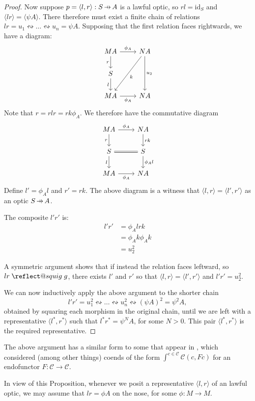 \documentclass[11pt,a4paper]{article}
\makeatletter
\theoremstyle{plain}
\theoremstyle{definition}
\newcommand{\C}{\mathscr{C}}
\newcommand{\id}{\mathrm{id}}
\newcommand{\hto}{\ensuremath{\,\mathaccent\shortmid\rightarrow\,}}
\providecommand{\leftsquigarrow}{%
  \mathrel{\mathpalette\reflect@squig\relax}%
}
\newcommand{\reflect@squig}[2]{%
  \reflectbox{$\m@th#1\rightsquigarrow$}%
}
\makeatother
\begin{document}
\begin{proof}
Now suppose $p = \langle l, r \rangle : S \hto A$ is a lawful optic, so $rl = \id_S$ and $\langle lr \rangle = \langle \psi A\rangle$. There therefore must exist a finite chain of relations $lr = u_1 \leftrightsquigarrow \dots \leftrightsquigarrow u_n = \psi A$.
Supposing that the first relation faces rightwards, we have a diagram:
\[
\begin{tikzcd}
M A \ar[r, "\phi_A"] \ar[d, "r", swap] & N A \ar[dd, "u_2"] \ar[ddl, "k"] \\
S \ar[d,"l",swap] & \\
M A \ar[r, "\phi_A", swap] & N A
\end{tikzcd}
\]
Note that $r = rlr = rk\phi_A$. We therefore have the commutative diagram
\[
\begin{tikzcd}
M A \ar[r, "\phi_A"] \ar[d, "r", swap] & N A \ar[d, "rk"] \\
S \ar[r, equal] \ar[d, "l", swap] & S \ar[d, "\phi_Al"] \\
MA \ar[r, "\phi_A", swap] & N A
\end{tikzcd}
\]
Define $l' = \phi_A l$ and $r' = rk$. The above diagram is a witness that $\langle l, r \rangle = \langle l', r' \rangle$ as an optic $S \hto A$.

The composite $l'r'$ is:
\begin{align*}
l'r' &= \phi_A l r k \\
&= \phi_A k \phi_A k \\
&= u_2^2
\end{align*}

A symmetric argument shows that if instead the relation faces leftward, so $lr \leftsquigarrow g$, there exists $l'$ and $r'$ so that $\langle l, r \rangle = \langle l', r' \rangle$ and $l'r' = u_2^2$.

We can now inductively apply the above argument to the shorter chain \[l'r' = u_1^2 \leftrightsquigarrow \dots \leftrightsquigarrow u_n^2 \leftrightsquigarrow (\psi A)^2 = \psi^2 A,\] obtained by squaring each morphism in the original chain, until we are left with a representative $\langle l^*, r^* \rangle$ such that $l^*r^* = \psi^N A$, for some $N>0$. This pair $\langle l^*, r^* \rangle$ is the required representative.
\end{proof}

The above argument has a similar form to some that appear in \cite{OnTheTrace}, which considered (among other things) coends of the form $\int^{c \in \C} \C(c, Fc)$ for an endofunctor $F : \C \to \C$.

In view of this Proposition, whenever we posit a representative $\langle l, r \rangle$ of an lawful optic, we may assume that $lr = \phi A$ on the nose, for some $\phi : M \to M$.
\end{document}
